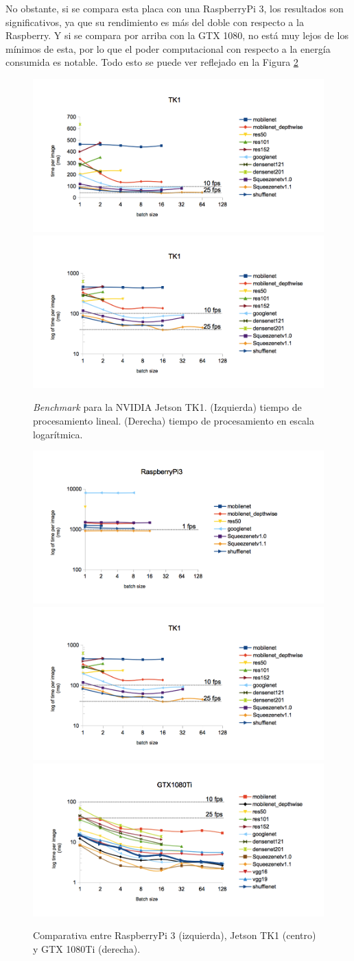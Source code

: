 No obstante, si se compara esta placa con una RaspberryPi 3, los resultados son significativos, ya que su rendimiento es más del doble con respecto a la Raspberry. Y si se compara por arriba con la GTX 1080, no está muy lejos de los mínimos de esta, por lo que el poder computacional con respecto a la energía consumida es notable. Todo esto se puede ver reflejado en la Figura \ref{fig:ben_tk1_comp}

\begin{figure}[htp]
    \centering
    \captionsetup{justification=centering}
    \includegraphics[width=.5\textwidth]{img/TK1_linear.png}\hfill
    \includegraphics[width=.5\textwidth]{img/TK1_log.png}
    \caption{\textit{Benchmark} para la NVIDIA Jetson TK1. (Izquierda) tiempo de procesamiento lineal. (Derecha) tiempo de procesamiento en escala logarítmica.}
    \label{fig:ben_tk1}
\end{figure}

\begin{figure}[htp]
    \centering
    \captionsetup{justification=centering}
    \includegraphics[width=.33\textwidth]{img/Raspi_log.png}\hfill
    \includegraphics[width=.33\textwidth]{img/TK1_log.png}\hfill
    \includegraphics[width=.33\textwidth]{img/gtx1080_log.png}
    \caption{Comparativa entre RaspberryPi 3 (izquierda), Jetson TK1 (centro) y GTX 1080Ti (derecha).}
    \label{fig:ben_tk1_comp}
\end{figure}

